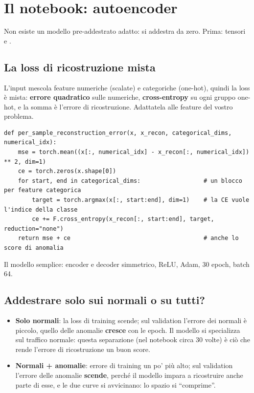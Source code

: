 \section{Il notebook: autoencoder}
Non esiste un modello pre-addestrato adatto: si addestra da zero. Prima: tensori e .

\subsection{La loss di ricostruzione mista}
L'input mescola feature numeriche (scalate) e categoriche (one-hot), quindi la loss è mista: \textbf{errore quadratico} sulle numeriche,
\textbf{cross-entropy} su ogni gruppo one-hot, e la somma è l'errore di ricostruzione. Adattatela alle feature del vostro problema.
\begin{lstlisting}
def per_sample_reconstruction_error(x, x_recon, categorical_dims, numerical_idx):
    mse = torch.mean((x[:, numerical_idx] - x_recon[:, numerical_idx]) ** 2, dim=1)
    ce = torch.zeros(x.shape[0])
    for start, end in categorical_dims:                  # un blocco per feature categorica
        target = torch.argmax(x[:, start:end], dim=1)    # la CE vuole l'indice della classe
        ce += F.cross_entropy(x_recon[:, start:end], target, reduction="none")
    return mse + ce                                      # anche lo score di anomalia
\end{lstlisting}
Il modello semplice: encoder  e decoder simmetrico, ReLU, Adam, 30 epoch, batch 64.

\subsection{Addestrare solo sui normali o su tutti?}
\begin{itemize}
  \item \textbf{Solo normali}: la loss di training scende; sul validation l'errore dei normali è piccolo, quello delle anomalie
        \textbf{cresce} con le epoch. Il modello si specializza sul traffico normale: questa separazione (nel notebook circa 30 volte) è ciò
        che rende l'errore di ricostruzione un buon score.
  \item \textbf{Normali + anomalie}: errore di training un po' più alto; sul validation l'errore delle anomalie \textbf{scende}, perché il
        modello impara a ricostruire anche parte di esse, e le due curve si avvicinano: lo spazio si ``comprime''.
\end{itemize}

